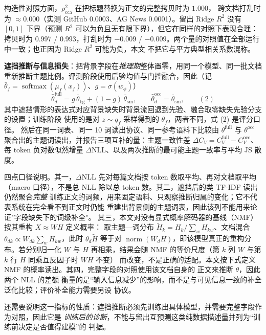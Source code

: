 \documentclass{article}
\begin{document}
构造性对照方面，$\rho^2_{\mathrm{cca}}$ 在把标题替换为正文的完整拷贝时为 $1.000$，
跨文档打乱时为 $\approx 0.000$（实测 GitHub 0.0003、AG News 0.0001）。留出 Ridge $R^2$
没有 $[0,1]$ 下界（预测 $R^2$ 可以为负且无有限下界），但它在同样的对照下表现合理：
拷贝时为 0.997 / 0.993，打乱时为 $-0.009$ / $-0.009$。两个量的对照值在全部运行中一致；也正因为 Ridge $R^2$ 可能为负，本文
不把它与平方典型相关系数混称。

\textbf{遮挡推断与信息损失}：把背景字段在\emph{推理期}整体置零，用同一个模型、同一批文档
重新推断主题比例。评测阶段使用后验均值与门控融合，因此（记
$\bar\theta_f=\operatorname{softmax}(\mu_f(x_f))$、$g=\sigma(w_\phi)$）
\begin{equation}
\hat\theta^{\mathrm{full}}_d=g\,\bar\theta_{\mathrm{bg}}+(1-g)\,\bar\theta_{\mathrm{sm}},
\qquad
\hat\theta^{\mathrm{occ}}_d=\bar\theta_{\mathrm{sm}},
\label{eq:occdrop}
\qquad(2)\end{equation}
其中遮挡情形的表达式对应背景缺失时背景流回退到先验、融合取零缺失先验分支的设置；训练阶段
使用的是对 $z\sim q_f$ 采样得到的 $\theta_f$，两者不同，式 (2) 是评分口径。
然后在同一词表、同一 10 词读出协议、同一参考语料下比较由 $\theta^{\mathrm{full}}$ 与
$\theta^{\mathrm{occ}}$ 聚合出的主题词读出，并报告三项互补的量：主题一致性差
$\Delta C_V=C_V^{\mathrm{full}}-C_V^{\mathrm{occ}}$、每 token 负对数似然增量
$\Delta\mathrm{NLL}$、以及两次推断的最可能主题一致率与平均 JS 散度。

四点口径说明。其一，$\Delta\mathrm{NLL}$ 先对每篇文档按 token 数取平均、再对文档取平均
（macro 口径），不是总 NLL 除以总 token 数。其二，遮挡后的类 TF-IDF 读出仍然聚合\emph{完整}
训练正文的词频，用来固定语料、只观察推断归属的变化；它不代表系统在完全看不到正文时仍能
重建出背景侧的主题词表，因此该列不能用来论证"字段缺失下的词级补全"。
其三，本文对没有显式概率解码器的基线（NMF）按其重构 $X\approx WH$
定义概率：
取主题—词分布 $\tilde H_k=H_k/\sum_w H_{kw}$、文档混合
$\theta_{dk}\propto W_{dk}\sum_w H_{kw}$，此时 $\theta_d\tilde H$ 等于对
$\operatorname{norm}(W_dH)$，即该模型真正的重构分布。若分别归一化 $W$ 与 $H$
再相乘，结果会随 NMF 的等价尺度（第 $k$ 列 $W$ 与第 $k$ 行 $H$ 同乘互反因子时 $WH$ 不变）
而改变，不是正确的适配。本文按下式定义 NMF 的概率读出。其四，完整字段的对照使用该文档自身的
正文来推断 $\theta$，因此两个 NLL 的差额
衡量的是“输入信息减少”的影响，而不是与可见信息一致的补全泛化比较；评价补全能力需要另设
协议。

还需要说明这一指标的性质：遮挡推断必须先训练出具体模型，并需要完整字段作为对照，因此它是
\emph{训练后的诊断}，不能与留出互预测这类纯数据描述量并列为“训练前决定是否值得建模”的
判据。
\end{document}
